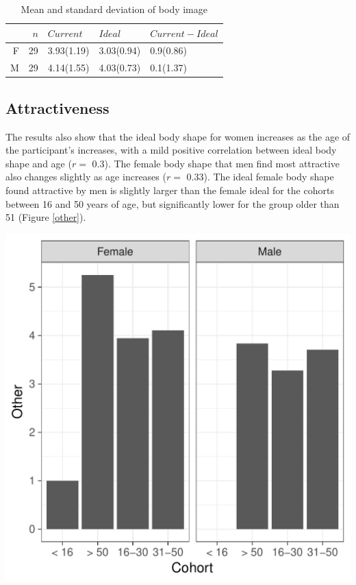 \documentclass[a4paper, apacite, jou, 11pt]{apa6}
\begin{document}
\begin{table}[ht]
\centering
\begin{tabular}{rrlll}
  \hline
 & $n$ & $Current$ & $Ideal$ & $Current-Ideal$ \\ 
  \hline
F &  29 & 3.93(1.19) & 3.03(0.94) & 0.9(0.86) \\ 
  M &  29 & 4.14(1.55) & 4.03(0.73) & 0.1(1.37) \\ 
   \hline
\end{tabular}
\caption{Mean and standard deviation of body image} 
\label{results}
\end{table}

\subsection{Attractiveness}
\label{sec:org1642477}
The results also show that the ideal body shape for women increases as the age of the participant's increases, with a mild positive correlation between ideal body shape and age (\(r=\) 0.3). The female body shape that men find most attractive also changes slightly as age increases (\(r=\) 0.33). The ideal female body shape found attractive by men is slightly larger than the female ideal for the cohorts between 16 and 50 years of age, but significantly lower for the group older than 51 (Figure \ref{other}).

\begin{center}
\includegraphics[width=.9\linewidth]{attractiveness.pdf}
\end{center}
\end{document}

